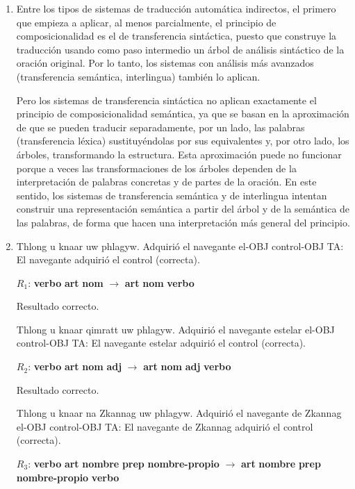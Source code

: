 \begin{enumerate}
\item Entre los tipos de sistemas de traducción automática indirectos, el primero que empieza a aplicar, al menos parcialmente, el principio de composicionalidad es el de transferencia sintáctica, puesto que construye la traducción usando como paso intermedio un árbol de análisis sintáctico de la oración original. Por lo tanto, los sistemas con análisis más avanzados (transferencia semántica, interlingua) también lo aplican. 

Pero los sistemas de transferencia sintáctica no aplican exactamente el principio de composicionalidad semántica, ya que se basan en la aproximación de que se pueden traducir separadamente, por un lado, las palabras (transferencia léxica) sustituyéndolas por sus equivalentes y, por otro lado, los árboles, transformando la estructura. Esta aproximación puede no funcionar porque a veces las transformaciones de los árboles dependen de la interpretación de palabras concretas y de partes de la oración. En este sentido, los sistemas de transferencia semántica y de interlingua intentan construir una representación semántica a partir del árbol y de la semántica de las palabras, de forma que hacen una interpretación más general del principio. 

\item

     \begin{example} 
     \gll Thlong u knaar uw phlagyw. 
          {Adquirió} el navegante el-OBJ control-OBJ 
     \glt TA: El navegante adquirió el control (correcta). 
     \glend
     \end{example} 
$R_1$: \textbf{verbo} \textbf{art} \textbf{nom} $\rightarrow$ \textbf{art} \textbf{nom} \textbf{verbo} 

Resultado correcto. 

     \begin{example} 
     \gll Thlong u knaar qimratt uw phlagyw. 
          {Adquirió} el navegante estelar el-OBJ control-OBJ 
     \glt TA: El navegante estelar adquirió el control (correcta). 
     \glend
     \end{example} 
$R_2$: \textbf{verbo} \textbf{art} \textbf{nom} \textbf{adj} $\rightarrow$ \textbf{art} \textbf{nom} \textbf{adj} \textbf{verbo} 

Resultado correcto. 

     \begin{example}
     \gll Thlong u knaar na Zkannag uw phlagyw. 
          {Adquirió} el navegante de Zkannag el-OBJ control-OBJ 
     \glt TA: El navegante de Zkannag adquirió el control (correcta). 
     \glend
\end{example} 
$R_3$: \textbf{verbo} \textbf{art} \textbf{nombre} \textbf{prep} \textbf{nombre-propio} $\rightarrow$ \textbf{art} \textbf{nombre} \textbf{prep} \textbf{nombre-propio} \textbf{verbo} 


\end{enumerate}
